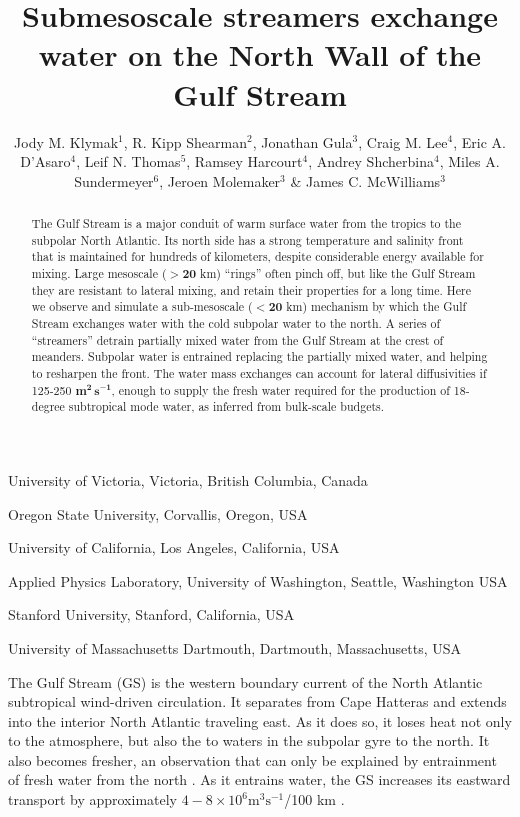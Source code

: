\documentclass{natureJMK}
\title{Submesoscale streamers exchange water on the North Wall of the Gulf Stream}
\author{Jody M. Klymak$^{1}$, R. Kipp Shearman$^2$, Jonathan Gula$^3$, Craig M. Lee$^4$, Eric A. D'Asaro$^4$, Leif N. Thomas$^5$, Ramsey Harcourt$^4$, Andrey Shcherbina$^4$, Miles A. Sundermeyer$^6$, Jeroen Molemaker$^3$ \& James C. McWilliams$^3$}
\begin{document}
\maketitle

\begin{affiliations}
 \item University of Victoria, Victoria, British Columbia, Canada
 \item Oregon State University, Corvallis, Oregon, USA
 \item University of California, Los Angeles, California, USA 
 \item Applied Physics Laboratory, University of Washington, Seattle, Washington USA
 \item Stanford University, Stanford, California, USA
 \item University of Massachusetts Dartmouth, Dartmouth, Massachusetts, USA
\end{affiliations}

\begin{abstract}
The Gulf Stream is a major conduit of warm surface water from the tropics to the subpolar North Atlantic.  Its north side has a strong  temperature and salinity front that is maintained for hundreds of kilometers, despite considerable energy available for mixing.  Large mesoscale ($\mathbf{>20}$ km) ``rings'' often pinch off, but like the Gulf Stream they are resistant to lateral mixing, and retain their properties for a long time.  Here we observe and simulate a sub-mesoscale ($\mathbf{<20}$ km) mechanism by which the Gulf Stream exchanges water with the cold subpolar water to the north. A series of ``streamers'' detrain partially mixed water from the Gulf Stream at the crest of meanders. Subpolar water is entrained replacing the partially mixed water, and helping to resharpen the front. The water mass exchanges can account for lateral diffusivities if 125-250 $\mathbf{m^2\,s^{-1}}$, enough to supply the fresh water required for the production of 18-degree subtropical mode water, as inferred from bulk-scale budgets. 
\end{abstract}

The Gulf Stream (GS) is the western boundary current of the North Atlantic subtropical wind-driven circulation.  It separates from Cape Hatteras and extends into the interior North Atlantic traveling east.  As it does so, it loses heat not only to  the atmosphere, but also the to waters in the subpolar gyre to the north.  It also becomes fresher, an observation that can only be explained by entrainment of fresh water from the north \cite{joyceetal13}.  As it entrains water, the GS  increases its eastward transport by approximately $4-8\times 10^6 \mathrm{m^3s^{-1}}$/100 km \cite{johnsetal95}.   
\end{document}
